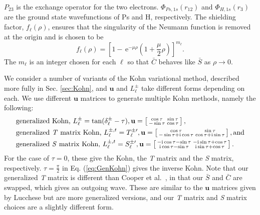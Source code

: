 \documentclass[preprint,showpacs,preprintnumbers,amsmath,amssymb,longbibliography,pra,aps]{revtex4-1}
\newcommand{\ee} {\,\text{e}}
\newcommand{\ii}{{\rm{i}}}
\begin{document}
$P_{23}$ is the exchange operator for the two electrons. $\Phi_{Ps,1s}\left(r_{12}\right)$ and $\Phi_{H,1s}\left(r_3\right)$ are the ground state wavefunctions of Ps and H, respectively. The shielding factor, $f_\ell(\rho)$, ensures that the singularity of the Neumann function is removed at the origin and is chosen to be
\begin{equation}
f_\ell(\rho) = \left[1 - \ee^{-\mu \rho} \left(1+\frac{\mu}{2}\rho\right)\right]^{m_\ell}.
\label{eq:PartialWaveShielding}
\end{equation}
The $m_\ell$ is an integer chosen for each $\ell$ so that $\bar{C}$ behaves like $\bar{S}$ as $\rho \rightarrow 0$.

We consider a number of variants of the Kohn variational method, described more fully in Sec. \ref{sec:Kohn}, and $\textbf{u}$ and $L^{\pm}_\ell$ take different forms depending on each. We use different $\textbf{u}$ matrices to generate multiple Kohn methods, namely the following:
\begin{subequations}
\label{eq:KohnU}
\begin{align}
&\text{generalized Kohn, } L^{\pm}_\ell = \tan(\delta^{\pm}_\ell-\tau), \textbf{u} = \left[ \begin{smallmatrix}
\cos \tau & \sin \tau \\  -\sin \tau & \cos \tau
\end{smallmatrix} \right], \label{eq:GenKohn}\\
&\text{generalized \emph{T} matrix Kohn, } L^{\pm,t}_\ell = T_\ell^{\pm\prime}, \textbf{u} = \left[ \begin{smallmatrix}
\cos\tau & \sin\tau \\ -\sin\tau + \ii \cos\tau & \cos\tau + \ii \sin\tau
\end{smallmatrix} \right], \text{and}\label{eq:GenTKohn} \\
&\text{generalized \emph{S} matrix Kohn, } L^{\pm,t}_\ell = S_\ell^{\pm\prime}, \textbf{u} = \left[ \begin{smallmatrix}
-\ii \cos\tau - \sin\tau & -\ii\sin\tau + \cos\tau \\ \ii\cos\tau - \sin\tau & \ii\sin\tau + \cos\tau
\end{smallmatrix} \right]. \label{eq:GenSKohn}
\end{align}
\end{subequations}
For the case of $\tau = 0$, these give the Kohn, the \emph{T} matrix and the \emph{S} matrix, respectively. $\tau = \frac{\pi}{2}$ in Eq. (\ref{eq:GenKohn}) gives the inverse Kohn. Note that our generalized \emph{T} matrix is different than Cooper et al.\ \cite{Cooper2010}, in that our $\bar{S}$ and $\bar{C}$ are swapped, which gives an outgoing wave. These are similar to the $\textbf{u}$ matrices given by Lucchese \cite{Lucchese1989} but are more generalized versions, and our \emph{T} matrix and \emph{S} matrix choices are a slightly different form.
\end{document}
